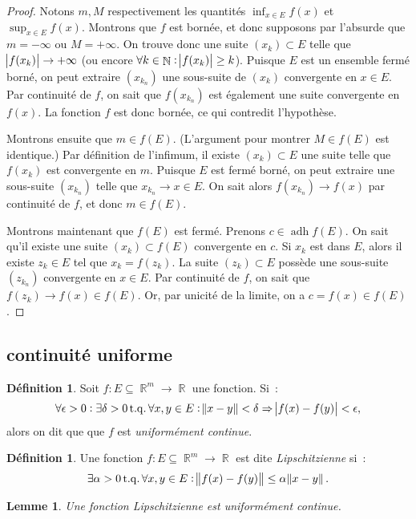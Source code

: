 \documentclass{article}
\DeclareMathOperator{\N}{\mathbb N}
\DeclareMathOperator{\R}{\mathbb R}
\DeclareMathOperator{\adh}{adh}
\DeclareMathOperator{\tq}{ t.q. }
\newcommand{\frmr}[2]{#1 : #2 \subseteq \R^m \to \R}
\newtheorem{lem}[thm]{Lemme}
\theoremstyle{definition}
\newtheorem{déf}[thm]{Définition}
\theoremstyle{remark}
\begin{document}
		\begin{proof} Notons $m, M$ respectivement les quantités $\inf_{x \in E}f(x)$ et $\sup_{x \in E}f(x)$. Montrons que $f$ est bornée, et donc supposons par
		l'absurde que $m = -\infty$ ou $M = +\infty$.  On trouve donc une suite $(x_k) \subset E$ telle que $\abs {f(x_k)} \to +\infty$ (ou encore
		$\forall k \in \N : \abs{f(x_k)} \geq k$). Puisque $E$ est un ensemble fermé borné, on peut extraire $(x_{k_n})$ une sous-suite de $(x_k)$ convergente
		en $x \in E$. Par continuité de $f$, on sait que $f(x_{k_n})$ est également une suite convergente en $f(x)$. La fonction $f$ est donc bornée, ce qui
		contredit l'hypothèse.

		Montrons ensuite que $m \in f(E)$. (L'argument pour montrer $M \in f(E)$ est identique.) Par définition de l'infimum, il existe $(x_k) \subset E$ une
		suite telle que $f(x_k)$ est convergente en $m$. Puisque $E$ est fermé borné, on peut extraire une sous-suite $(x_{k_n})$ telle que $x_{k_n} \to x \in E$.
		On sait alors $f(x_{k_n}) \to f(x)$ par continuité de $f$, et donc $m \in f(E)$.

		Montrons maintenant que $f(E)$ est fermé. Prenons $c \in \adh f(E)$. On sait qu'il existe une suite $(x_k) \subset f(E)$ convergente en $c$. Si $x_k$
		est dans $E$, alors il existe $z_k \in E$ tel que $x_k = f(z_k)$. La suite $(z_k) \subset E$ possède une sous-suite $(z_{k_n})$ convergente en $x \in E$.
		Par continuité de $f$, on sait que $f(z_k) \to f(x) \in f(E)$. Or, par unicité de la limite, on a $c = f(x) \in f(E)$.
		\end{proof}

	\subsection{continuité uniforme}
		\begin{déf} Soit $\frmr fE$ une fonction. Si~:
		\[\forall \epsilon > 0 : \exists \delta > 0 \tq \forall x, y \in E : \norm{x-y} < \delta \Rightarrow \abs{f(x)-f(y)} < \epsilon,\]
		alors on dit que que $f$ est \emph{uniformément continue}.
		\end{déf}

		\begin{déf} Une fonction $\frmr fE$ est dite \emph{Lipschitzienne} si~:
		\[\exists \alpha > 0 \tq \forall x, y \in E : \norm{f(x)-f(y)} \leq \alpha\norm{x-y}.\]
		\end{déf}

		\begin{lem} Une fonction Lipschitzienne est uniformément continue. \end{lem}
\end{document}
